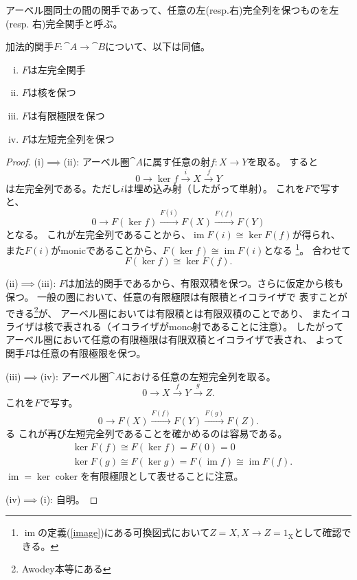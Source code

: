 \documentclass[a4j]{jarticle}
\newcommand{\coker}{\operatorname{coker}}
\newcommand{\im}{\operatorname{im}}
\newcommand{\arr}[1]{\overset{#1}{\longrightarrow}}
\begin{document}
\begin{Def}
    アーベル圏同士の間の関手であって、任意の左(resp.右)完全列を保つものを左(resp. 右)完全関手と呼ぶ。
\end{Def}

\begin{Them}
    加法的関手$F: \cat{A} \to \cat{B}$について、以下は同値。
    \begin{enumerate}[(i)]
        \item $F$は左完全関手
        \item $F$は核を保つ
        \item $F$は有限極限を保つ
        \item $F$は左短完全列を保つ
    \end{enumerate}
\end{Them}
\begin{proof}
    (i)$\implies$(ii):
    アーベル圏$\cat{A}$に属す任意の射$f:X \to Y$を取る。
    すると
    \[ 0 \to \ker f \arr{i} X \arr{f} Y \]
    は左完全列である。ただし$i$は埋め込み射（したがって単射）。
    これを$F$で写すと、
    \[ 0 \to F(\ker f) \arr{F(i)} F(X) \arr{F(f)} F(Y) \]
    となる。
    これが左完全列であることから、$ \im F(i) \cong \ker F(f) $が得られ、
    また$F(i)$がmonicであることから、$ F(\ker f) \cong \im F(i) $となる
    \footnote{$\im$の定義(\ref{image})にある可換図式において$Z=X, X \to Z=\mathrm{1_{X}}$として確認できる。}。 %
    合わせて\[ F(\ker f) \cong \ker F(f). \]

    (ii)$\implies$(iii):
    $F$は加法的関手であるから、有限双積を保つ。さらに仮定から核も保つ。
    一般の圏において、任意の有限極限は有限積とイコライザで
    表すことができる\footnote{Awodey本等にある}が、
    アーベル圏においては有限積とは有限双積のことであり、
    またイコライザは核で表される（イコライザがmono射であることに注意）。
    したがってアーベル圏において任意の有限極限は有限双積とイコライザで表され、
    よって関手$F$は任意の有限極限を保つ。

    (iii)$\implies$(iv):
    アーベル圏$\cat{A}$における任意の左短完全列を取る。
    \[ 0 \to X \arr{f} Y \arr{g} Z. \]
    これを$F$で写す。
    \[ 0 \to F(X) \arr{F(f)} F(Y) \arr{F(g)} F(Z). \]る
    これが再び左短完全列であることを確かめるのは容易である。
    \begin{align*}
        &\ker F(f) \cong F(\ker f) = F(0) = 0 \\
        &\ker F(g) \cong F(\ker g) = F(\im f) \cong \im F(f).
    \end{align*}
    $\im=\ker \coker$を有限極限として表せることに注意。

    (iv)$\implies$(i): 自明。 %

\end{proof}
\end{document}
